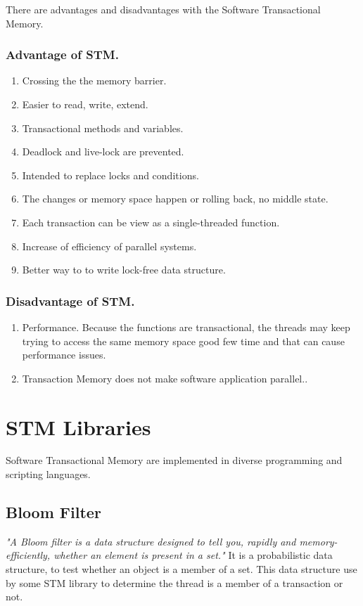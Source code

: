 \documentclass[12pt]{article}
\begin{document}
{\setlength{\parindent}{0cm}
There are advantages and disadvantages with the Software Transactional Memory.
\subsubsection{Advantage of STM.}
\begin{enumerate}
\item Crossing the the memory barrier.
\item Easier to read, write, extend.
\item Transactional methods and variables.
\item Deadlock and live-lock are prevented.
\item Intended to replace locks and conditions.
\item The changes or memory space happen or rolling back, no middle state.
\item Each transaction can be view as a single-threaded function.
\item Increase of efficiency of parallel systems.
\item Better way to to write lock-free data structure.
\end{enumerate}
\subsubsection{Disadvantage of STM.}
\begin{enumerate}
\item Performance. Because the functions are transactional, the threads may keep trying to access the same memory space good few time and that can cause performance issues.
\item Transaction Memory does not make software application parallel..
\end{enumerate}

}

\clearpage
\section{STM Libraries}
Software Transactional Memory are implemented in diverse programming and scripting languages.
\subsection{Bloom Filter}
\textit{"A Bloom filter is a data structure designed to tell you, rapidly and memory-efficiently, whether an element is present in a set."}\cite{Bloom} It is a probabilistic data structure, to test whether an object is a member of a set. This data structure use by some STM library to determine the thread is a member of a transaction or not.
\end{document}

